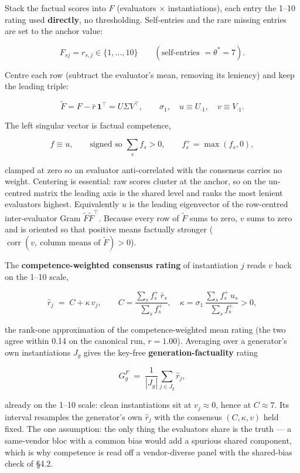 \documentclass{article}
\begin{document}
Stack the factual scores into \(F\) (evaluators \ensuremath{\times} instantiations), each entry the 1--10 rating used \textbf{directly}, no thresholding. Self-entries and the rare missing entries are set to the anchor value:

\[ F_{sj}=r_{s,j}\in\{1,\dots,10\}\qquad(\text{self-entries }=\theta^{*}=7). \tag{A5}\]

Centre each row (subtract the evaluator's mean, removing its leniency) and keep the leading triple:

\[ \tilde F = F-\bar r\,\mathbf 1^{\top}=U\Sigma V^{\top},\qquad \sigma_1,\quad u\equiv U_{\cdot 1},\quad v\equiv V_{\cdot 1}. \tag{A6}\]

The left singular vector is factual competence,

\[ f\equiv u,\qquad \text{signed so } \textstyle\sum_s f_s>0,\qquad f^{+}_s=\max(f_s,0), \tag{A7}\]

clamped at zero so an evaluator anti-correlated with the consensus carries no weight. Centering is essential: raw scores cluster at the anchor, so on the un-centred matrix the leading axis is the shared level and ranks the most lenient evaluators highest. Equivalently \(u\) is the leading eigenvector of the row-centred inter-evaluator Gram \(\tilde F\tilde F^{\top}\). Because every row of \(\tilde F\) sums to zero, \(v\) sums to zero and is oriented so that positive means factually stronger (\(\operatorname{corr}(v,\ \text{column means of }\tilde F)>0\)).

The \textbf{competence-weighted consensus rating} of instantiation \(j\) reads \(v\) back on the 1--10 scale,

\[ \hat r_j \;=\; C+\kappa\,v_j,\qquad C=\frac{\sum_s f^{+}_s\,\bar r_s}{\sum_s f^{+}_s},\quad \kappa=\sigma_1\,\frac{\sum_s f^{+}_s\,u_s}{\sum_s f^{+}_s}>0, \tag{A8}\]

the rank-one approximation of the competence-weighted mean rating (the two agree within 0.14 on the canonical run, \(r = 1.00\)). Averaging over a generator's own instantiations \(J_g\) gives the key-free \textbf{generation-factuality} rating

\[ G^{F}_{g} \;=\; \frac1{|J_g|}\sum_{j\in J_g}\hat r_j, \tag{A9}\]

already on the 1--10 scale: clean instantiations sit at \(v_j\approx0\), hence at \(C\approx7\). Its interval resamples the generator's own \(\hat r_j\) with the consensus \((C,\kappa,v)\) held fixed. The one assumption: the only thing the evaluators share is the truth --- a same-vendor bloc with a common bias would add a spurious shared component, which is why competence is read off a vendor-diverse panel with the shared-bias check of \S{}4.2.
\end{document}
